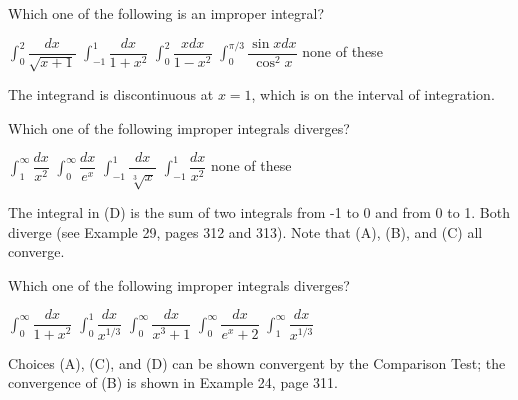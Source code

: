 \question
Which one of the following is an improper integral?
\begin{choices}
  \choice $\int_{0}^{2} \dfrac{d x}{\sqrt{x+1}}$
  \choice $\int_{-1}^{1} \dfrac{d x}{1+x^{2}}$
  \CorrectChoice $\int_{0}^{2} \dfrac{x d x}{1-x^{2}}$
  \choice $\int_{0}^{\pi / 3} \dfrac{\sin x d x}{\cos ^{2} x}$
  \choice none of these
\end{choices}
\begin{solution}
The integrand is discontinuous at $x=1$, which is on the interval of integration.
\end{solution}



\newpage



\question
Which one of the following improper integrals diverges?
\begin{choices}
  \choice $\int_{1}^{\infty} \dfrac{d x}{x^{2}}$
  \choice $\int_{0}^{\infty} \dfrac{d x}{e^{x}}$
  \choice $\int_{-1}^{1} \dfrac{d x}{\sqrt[3]{x}}$
  \CorrectChoice $\int_{-1}^{1} \dfrac{d x}{x^{2}}$
  \choice none of these
\end{choices}
\begin{solution}
The integral in (D) is the sum of two integrals from -1 to 0 and from 0 to 1. Both diverge (see Example 29, pages 312 and 313). Note that (A), (B), and (C) all converge.
\end{solution}

\question
Which one of the following improper integrals diverges?
\begin{choices}
  \choice $\int_{0}^{\infty} \dfrac{d x}{1+x^{2}}$
  \choice $\int_{0}^{1} \dfrac{d x}{x^{1 / 3}}$
  \choice $\int_{0}^{\infty} \dfrac{d x}{x^{3}+1}$
  \choice $\int_{0}^{\infty} \dfrac{d x}{e^{x}+2}$
  \CorrectChoice $\int_{1}^{\infty} \dfrac{d x}{x^{1 / 3}}$

\end{choices}
\begin{solution}
Choices (A), (C), and (D) can be shown convergent by the Comparison Test; the convergence of (B) is shown in Example 24, page 311.

\end{solution}
